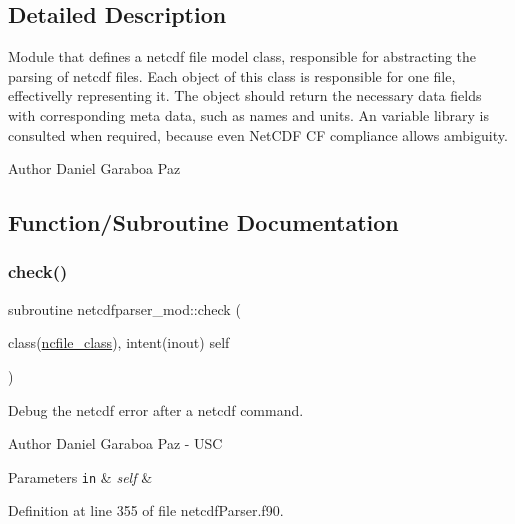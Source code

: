 \subsection{Detailed Description}
Module that defines a netcdf file model class, responsible for abstracting the parsing of netcdf files. Each object of this class is responsible for one file, effectivelly representing it. The object should return the necessary data fields with corresponding meta data, such as names and units. An variable library is consulted when required, because even Net\+C\+DF CF compliance allows ambiguity. 

\begin{DoxyAuthor}{Author}
Daniel Garaboa Paz 
\end{DoxyAuthor}


\subsection{Function/\+Subroutine Documentation}
\mbox{\label{namespacenetcdfparser__mod_ae1a034f6540ac7a1ce7d0e3831bb2f03}} 
\subsubsection{\texorpdfstring{check()}{check()}}
{\footnotesize\ttfamily subroutine netcdfparser\+\_\+mod\+::check (\begin{DoxyParamCaption}\item[{class(\mbox{\hyperlink{structnetcdfparser__mod_1_1ncfile__class}{ncfile\+\_\+class}}), intent(inout)}]{self }\end{DoxyParamCaption})\hspace{0.3cm}{\ttfamily [private]}}



Debug the netcdf error after a netcdf command. 

\begin{DoxyAuthor}{Author}
Daniel Garaboa Paz -\/ U\+SC 
\end{DoxyAuthor}

\begin{DoxyParams}[1]{Parameters}
\mbox{\tt in}  & {\em self} & \\
\hline
\end{DoxyParams}


Definition at line 355 of file netcdf\+Parser.\+f90.


